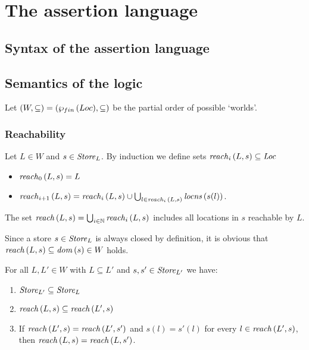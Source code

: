 \documentclass[12pt,a4paper]{report}
\begin{document}

\chapter{The assertion language}



\section{Syntax of the assertion language}



\section{Semantics of the logic}

Let $(W,\subseteq) = (\wp_{fin}\,(Loc),\subseteq)$ be the partial order of possible `worlds'.



\subsection{Reachability}

\begin{definition}[Reachability]
  Let $L\in W$ and $s\in\mathit{Store}_L$. By induction we define sets $\mathit{reach}_{i}\,(L,s) \subseteq \mathit{Loc}$
  \begin{itemize}
    \item $\mathit{reach}_{0}\,(L,s) = L$
    \item $\mathit{reach}_{i+1}\,(L,s) = \mathit{reach}_{i}\,(L,s) \cup \bigcup_{l\in\mathit{reach}_{i}\,(L,s)} \mathit{locns}\,(s(l))$.
  \end{itemize}
  The set $\mathit{reach}\,(L,s) = \bigcup_{i\in\mathbb N} \mathit{reach}_{i}\,(L,s)$ includes all locations in $s$ reachable
  by $L$.
\end{definition}

Since a store $s\in\mathit{Store}_L$ is always closed by definition, it is obvious that
$\mathit{reach}\,(L,s) \subseteq \mathit{dom}\,(s) \in  W$ holds.

\begin{lemma}
  For all $L,L'\in W$ with $L \subseteq L'$ and $s,s'\in\mathit{Store}_{L'}$ we have:
  \begin{enumerate}
    \item $\mathit{Store}_{L'} \subseteq \mathit{Store}_L$
    \item $\mathit{reach}\,(L,s) \subseteq \mathit{reach}\,(L',s)$
    \item If $\mathit{reach}\,(L',s) = \mathit{reach}\,(L',s')$ and $s(l) = s'(l)$ for every $l\in\mathit{reach}\,(L',s)$,
          then $\mathit{reach}\,(L,s) = \mathit{reach}\,(L,s')$.
  \end{enumerate}
\end{lemma}
\end{document}
